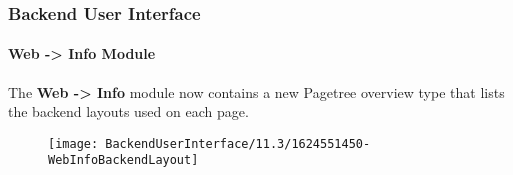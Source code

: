 %

\begin{frame}[fragile]
	\frametitle{Backend User Interface}
	\framesubtitle{Web -> Info Module}

	The \textbf{Web -> Info} module now contains a new Pagetree overview type
	that lists the backend layouts used on each page.

	\begin{figure}
		\texttt{[image: BackendUserInterface/11.3/1624551450-WebInfoBackendLayout]}
	\end{figure}

\end{frame}

